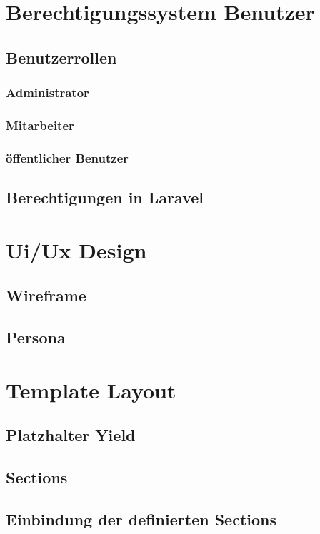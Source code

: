 \section{Berechtigungssystem Benutzer}
\subsection{Benutzerrollen}
\subsubsection{Administrator}
\subsubsection{Mitarbeiter}
\subsubsection{öffentlicher Benutzer}
\subsection{Berechtigungen in Laravel}

\section{Ui/Ux Design}
\subsection{Wireframe}
\subsection{Persona}

\section{Template Layout}
\subsection{Platzhalter Yield}
\subsection{Sections}
\subsection{Einbindung der definierten Sections}

